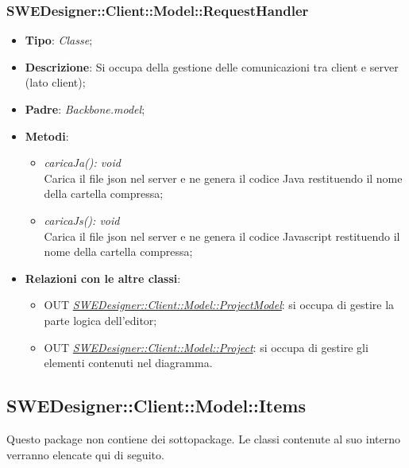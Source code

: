 \documentclass[../DefinizioneDiProdotto.tex]{subfiles}
\begin{document}
				\subsubsection{SWEDesigner::Client::Model::RequestHandler}
				\hypertarget{SWEDesigner::Client::Model::RequestHandler}{}
					\begin{itemize}
						\item \textbf{Tipo}: \emph{Classe};
						\item \textbf{Descrizione}: Si occupa della gestione delle comunicazioni tra client e server (lato client);
						\item \textbf{Padre}: \emph{Backbone.model};
						\item \textbf{Metodi}:
						\begin{itemize}
							\item \emph{caricaJa(): void} \\
							Carica il file json nel server e ne genera il codice Java restituendo il nome della cartella compressa; \\
							\item \emph{caricaJs(): void} \\
							Carica il file json nel server e ne genera il codice Javascript restituendo il nome della cartella compressa; \\
						\end{itemize}
						\item \textbf{Relazioni con le altre classi}:
						\begin{itemize}
							\item OUT \hyperlink{SWEDesigner::Client::Model::ProjectModel}{\emph{SWEDesigner::Client::Model::ProjectModel}}: si occupa di gestire la parte logica dell'editor;
							\item OUT \hyperlink{SWEDesigner::Client::Model::Project}{\emph{SWEDesigner::Client::Model::Project}}: si occupa di gestire gli elementi contenuti nel diagramma.
						\end{itemize}
					\end{itemize}
		
			
			\subsection{SWEDesigner::Client::Model::Items}
			\hypertarget{SWEDesigner::Client::Model::Items}{}
			Questo package non contiene dei sottopackage. Le classi contenute al suo interno verranno
			elencate qui di seguito.
			
\end{document}
